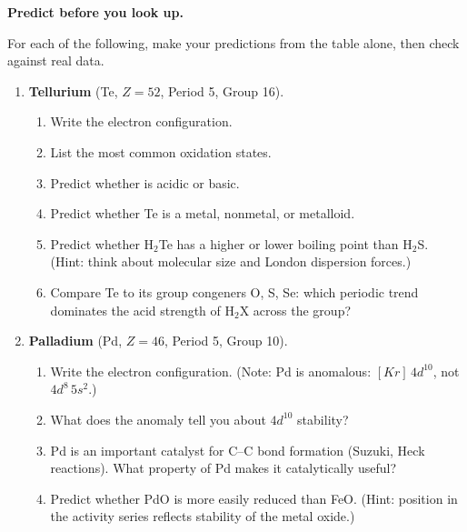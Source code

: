 \documentclass[12pt, a4paper]{book}
\begin{document}
\begin{problembox}
\textbf{Predict before you look up.}

For each of the following, make your predictions from
the table alone, then check against real data.

\begin{enumerate}[label=\textbf{\arabic*.}]
  \item \textbf{Tellurium} (Te, $Z=52$, Period 5, Group 16).
        \begin{enumerate}[label=(\alph*)]
          \item Write the electron configuration.
          \item List the most common oxidation states.
          \item Predict whether  is acidic or basic.
          \item Predict whether Te is a metal, nonmetal,
                or metalloid.
          \item Predict whether H$_2$Te has a higher or
                lower boiling point than H$_2$S.
                (Hint: think about molecular size and
                London dispersion forces.)
          \item Compare Te to its group congeners O, S, Se:
                which periodic trend dominates the
                acid strength of H$_2$X across the group?
        \end{enumerate}

  \item \textbf{Palladium} (Pd, $Z=46$, Period 5, Group 10).
        \begin{enumerate}[label=(\alph*)]
          \item Write the electron configuration.
                (Note: Pd is anomalous: $[Kr]\,4d^{10}$, not $4d^8\,5s^2$.)
          \item What does the anomaly tell you about
                $4d^{10}$ stability?
          \item Pd is an important catalyst for C--C
                bond formation (Suzuki, Heck reactions).
                What property of Pd makes it catalytically useful?
          \item Predict whether PdO is more easily
                reduced than FeO.
                (Hint: position in the activity series
                reflects stability of the metal oxide.)
        \end{enumerate}


\end{enumerate}
\end{problembox}
\end{document}
